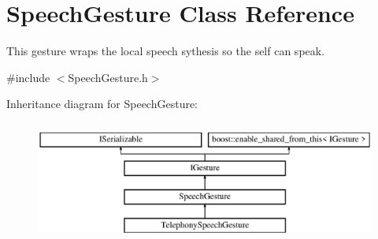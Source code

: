 \hypertarget{class_speech_gesture}{}\section{Speech\+Gesture Class Reference}
\label{class_speech_gesture}


This gesture wraps the local speech sythesis so the self can speak.  




{\ttfamily \#include $<$Speech\+Gesture.\+h$>$}

Inheritance diagram for Speech\+Gesture\+:\begin{figure}[H]
\begin{center}
\leavevmode
\includegraphics[height=4.000000cm]{class_speech_gesture}
\end{center}
\end{figure}
